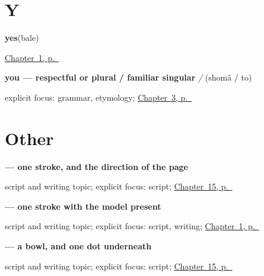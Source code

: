 \section*{Y}

\noindent\begin{minipage}[t]{\linewidth}
\raggedright
\textbf{yes}\enspace\emph{}\enspace(bale)\par
\footnotesize \hyperref[ch:persian-greetings]{Chapter~1, p.~\pageref*{ch:persian-greetings}}
\end{minipage}\par\smallskip

\noindent\begin{minipage}[t]{\linewidth}
\raggedright
\textbf{you — respectful or plural / familiar singular}\enspace\emph{ / }\enspace(shomâ / to)\par
\footnotesize explicit focus: grammar, etymology; \hyperref[ch:fa-ask-and-answer-names]{Chapter~3, p.~\pageref*{ch:fa-ask-and-answer-names}}
\end{minipage}\par\smallskip

\section*{Other}

\noindent\begin{minipage}[t]{\linewidth}
\raggedright
\textbf{ — one stroke, and the direction of the page}\par
\footnotesize script and writing topic; explicit focus: script; \hyperref[ch:fa-script-nine]{Chapter~15, p.~\pageref*{ch:fa-script-nine}}
\end{minipage}\par\smallskip

\noindent\begin{minipage}[t]{\linewidth}
\raggedright
\textbf{ — one stroke with the model present}\par
\footnotesize script and writing topic; explicit focus: script, writing; \hyperref[ch:persian-greetings]{Chapter~1, p.~\pageref*{ch:persian-greetings}}
\end{minipage}\par\smallskip

\noindent\begin{minipage}[t]{\linewidth}
\raggedright
\textbf{ — a bowl, and one dot underneath}\par
\footnotesize script and writing topic; explicit focus: script; \hyperref[ch:fa-script-nine]{Chapter~15, p.~\pageref*{ch:fa-script-nine}}
\end{minipage}\par\smallskip

